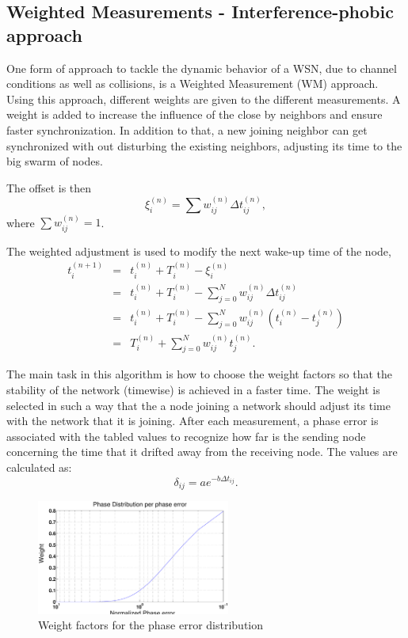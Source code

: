 \documentclass[a4paper,10pt]{report}
\begin{document}
\subsection{\textbf{Weighted Measurements - Interference-phobic approach}}
One form of approach to tackle the dynamic behavior of a WSN, due to channel conditions as well as collisions, is a
Weighted Measurement (WM) approach. Using this approach, different
weights are given to the different measurements. A weight is added to
increase the influence of the close by neighbors and ensure
faster synchronization. In addition to that, a new joining neighbor
can get synchronized with out disturbing the existing neighbors,
adjusting its time to the big swarm of nodes.\par
The offset is then
\begin{equation}
\xi_i^{(n)} = \sum{w_{ij}^{(n)}\Delta t_{ij}^{(n)}} ,
\end{equation}
where $\sum{w_{ij}^{(n)}= 1}$.
\par
The weighted adjustment is used to modify the next wake-up time of
the node,
\begin{eqnarray*}
t_i^{(n+1)} &=& t_i^{(n)} + T_i^{(n)} - \xi_i^{(n)} \\ &=& t_i^{(n)}
+ T_i^{(n)} - \sum_{j=0}^N{w_{ij}^{(n)}\Delta t_{ij}^{(n)}} \\ &=&
t_i^{(n)}+ T_i^{(n)} -
\sum_{j=0}^N{w_{ij}^{(n)}(t_i^{(n)}-t_j^{(n)})} \\ &=& T_i^{(n)} + \sum_{j=0}^N{w_{ij}^{(n)}t_j^{(n)}}.
\end{eqnarray*}
\par
The main task in this algorithm is how to choose the weight factors so that the stability of the network (timewise) is achieved in a faster time. The weight is selected in such a way that the a node joining a network should adjust its time with the network that it is joining. After each measurement, a phase error is associated with the tabled values to recognize how far is the sending node concerning the time that it drifted away from the receiving node. The values are calculated as:
\begin{equation}
\delta_{ij} = ae^{-b\Delta t_{ij}}.
\end{equation}
\begin{figure}[t]
\centering
\includegraphics[width= 2.5in]{weight}
\caption{Weight factors for the phase error distribution}
\label{weight}
\end{figure}
\end{document}
